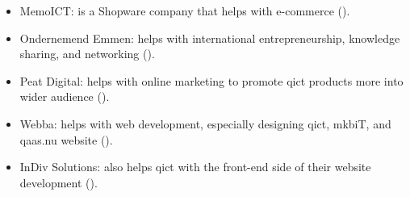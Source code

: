 \begin{multicols}{2}
      \begin{itemize}
            \item MemoICT: is a Shopware company that helps with e-commerce (\textit{\cite{memoICT}}).
            \item Ondernemend Emmen: helps with international entrepreneurship, knowledge sharing, and networking
                  (\textit{\cite{ondernemendEmmen}}).
            \item Peat Digital: helps with online marketing to promote \acrshort{qict} products more into wider audience
                  (\textit{\cite{peatDigital}}).
            \item Webba: helps with web development, especially designing \acrshort{qict}, \acrshort{mkb}iT, and \acrshort{qaas}.nu website
                  (\textit{\cite{webba}}).
            \item InDiv Solutions: also helps \acrshort{qict} with the front-end side of their website development
                  (\textit{\cite{indivSolution}}).
      \end{itemize}


\end{multicols}

